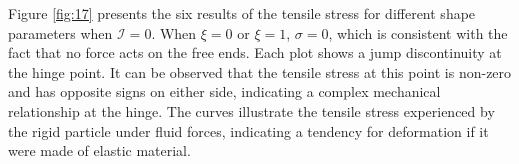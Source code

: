 \documentclass[a4paper,12pt]{report}
\begin{document}
Figure \ref{fig:17} presents the six results of the tensile stress for different shape parameters when $\mathcal{I}=0$. When $\xi=0$ or $\xi=1$, $\sigma=0$, which is consistent with the fact that no force acts on the free ends. Each plot shows a jump discontinuity at the hinge point. It can be observed that the tensile stress at this point is non-zero and has opposite signs on either side, indicating a complex mechanical relationship at the hinge. The curves illustrate the tensile stress experienced by the rigid particle under fluid forces, indicating a tendency for deformation if it were made of elastic material. 



\end{document}
